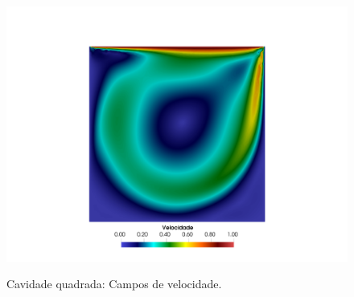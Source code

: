 \documentclass[tese_patricia]{subfiles}%
\begin{document}
\begin{figure}[!t]
	\\[3.0ex]
	\includegraphics[scale=0.4,trim=12cm 0cm 12cm 32.5cm, clip=true]{Imagens/Cap2/cavidade_velRe1000.pdf}
	
	\caption{Cavidade quadrada: Campos de velocidade.}
	\label{fig:cavidade_vel}
\end{figure}
\end{document}
